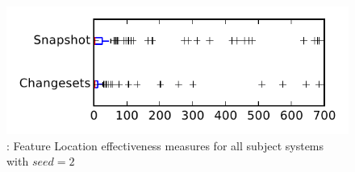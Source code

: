 
\begin{figure}
\centering
\includegraphics[height=0.4\textheight]{figures/flt_seed/rq1_tiny_2}
\caption{\rone: Feature Location effectiveness measures for all subject systems with $seed=2$}
\label{fig:flt_seed:rq1:tiny}
\end{figure}
